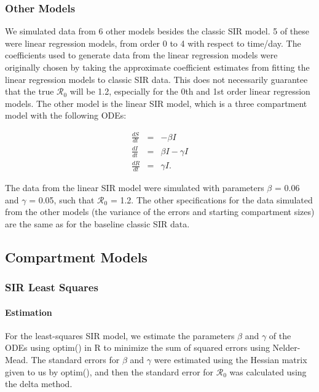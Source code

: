 \documentclass[12pt]{article}
\newcommand{\rr}{\ensuremath{\mathcal{R}_0}}
\begin{document}
\subsubsection{Other Models}
We simulated data from 6 other models besides the classic SIR model. 5 of these were linear regression models, from order 0 to 4 with respect to time/day. The coefficients used to generate data from the linear regression models were originally chosen by taking the approximate coefficient estimates from fitting the linear regression models to classic SIR data. This does not necessarily guarantee that the true $\rr$ will be 1.2, especially for the 0th and 1st order linear regression models. The other model is the linear SIR model, which is a three compartment model with the following ODEs:

	\begin{eqnarray*}
		\frac{dS}{dt} &=& -\beta I \\
		\frac{dI}{dt} &=& \beta I - \gamma I \\
		\frac{dR}{dt} &=& \gamma I.
	\end{eqnarray*}

 The data from the linear SIR model were simulated with parameters $\beta$ = 0.06 and $\gamma$ = 0.05, such that $\rr$ = 1.2. The other specifications for the data simulated from the other models (the variance of the errors and starting compartment sizes) are the same as for the baseline classic SIR data.

\subsection{Compartment Models}

\subsubsection{SIR Least Squares}

\paragraph{Estimation}

For the least-squares SIR model, we estimate the parameters $\beta$ and $\gamma$ of the ODEs using optim() in R to minimize the sum of squared errors using Nelder-Mead. The standard errors for $\beta$ and $\gamma$ were estimated using the Hessian matrix given to us by optim(), and then the standard error for $\rr$ was calculated using the delta method.
\end{document}
